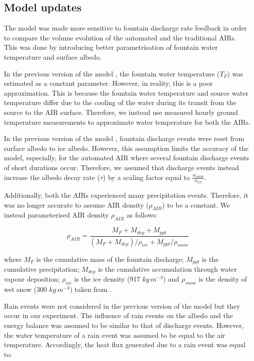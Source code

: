 \documentclass[tc, manuscript]{copernicus}
\begin{document}
\subsection{Model updates}

The model was made more sensitive to fountain discharge rate feedback in order to compare the volume evolution
of the automated and the traditional AIRs. This was done by introducing better parametrisation of fountain water
temperature and surface albedo. 

In the previous version of the model \citep{balasubramanianInfluenceMeteorologicalConditions2022}, the fountain
water temperature ($T_F$) was estimated as a constant parameter. However, in reality, this is a poor
approximation. This is because the fountain water temperature and source water temperature differ due to the
cooling of the water during its transit from the source to the  AIR surface. Therefore, we instead use measured
hourly ground temperature measurements to approximate water temperature for both the AIRs.

In the previous version of the model \citep{balasubramanianInfluenceMeteorologicalConditions2022}, fountain
discharge events were reset from surface albedo to ice albedo. However, this assumption limits the accuracy of
the model, especially, for the automated AIR where several fountain discharge events of short durations occur.
Therefore, we assumed that discharge events instead increase the albedo decay rate ($\tau$) by a scaling
factor equal to $\frac{\alpha_{snow}}{\alpha_{ice}}$.

Additionally, both the AIRs experienced many precipitation events. Therefore, it was no longer accurate to
assume AIR density ($\rho_{AIR}$) to be a constant. We instead parameterised AIR density $\rho_{AIR}$ as follows:

\begin{equation}
  \rho_{AIR} = \frac{M_{F} + M_{dep} + M_{ppt}}{(M_{F} + M_{dep})/\rho_{ice} + M_{ppt}/\rho_{snow}}
\end{equation}

where $M_F$ is the cumulative mass of the fountain discharge; $M_{ppt}$ is the cumulative precipitation;
$M_{dep}$ is the cumulative accumulation through water vapour deposition; $\rho_{ice}$ is the ice density (917
$kg\,m^{-3}$) and $\rho_{snow}$ is the density of wet snow (300 $kg\,m^{-3}$) taken from
\cite{cuffeyPhysicsGlaciers2010} .

Rain events were not considered in the previous version of the model but they occur in our experiment. The
influence of rain events on the albedo and the energy balance was assumed to be similar to that of discharge
events. However, the water temperature of a rain event was assumed to be equal to the air temperature.
Accordingly, the heat flux generated due to a rain event was equal to:
\end{document}
